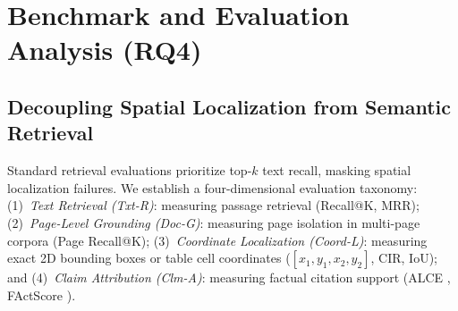 \documentclass[conference,a4paper]{IEEEtran}
\begin{document}
\section{Benchmark and Evaluation Analysis (RQ4)}

\subsection{Decoupling Spatial Localization from Semantic Retrieval}
Standard retrieval evaluations prioritize top-$k$ text recall, masking spatial localization failures. We establish a four-dimensional evaluation taxonomy: (1)~\emph{Text Retrieval (Txt-R)}: measuring passage retrieval (Recall@K, MRR); (2)~\emph{Page-Level Grounding (Doc-G)}: measuring page isolation in multi-page corpora (Page Recall@K); (3)~\emph{Coordinate Localization (Coord-L)}: measuring exact 2D bounding boxes or table cell coordinates ($[x_1, y_1, x_2, y_2]$, CIR, IoU); and (4)~\emph{Claim Attribution (Clm-A)}: measuring factual citation support (ALCE \cite{gao2023alce}, FActScore \cite{min2023factscore}).
\end{document}

